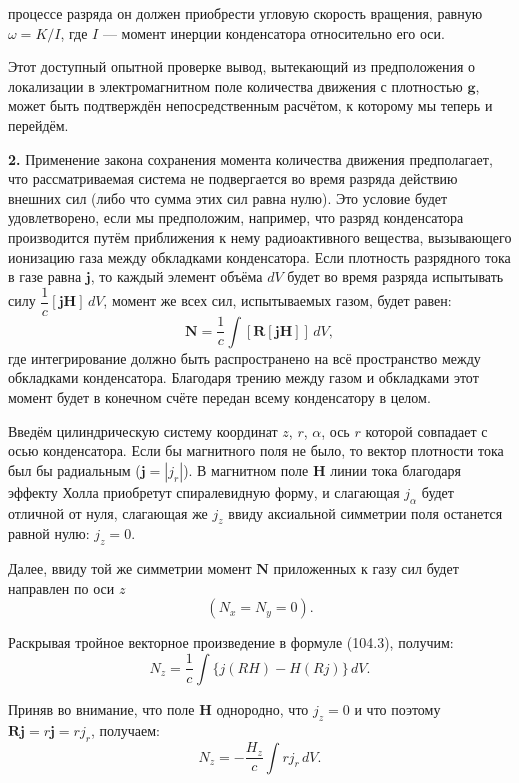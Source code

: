 \documentclass[a4paper,10pt]{article}
\begin{document}

процессе разряда он должен приобрести угловую скорость вращения, равную
$\omega = K/I$, где $I$ — момент инерции конденсатора относительно его оси.

Этот доступный опытной проверке вывод, вытекающий из предположения
о локализации в электромагнитном поле количества движения с плотностью
$\mathbf{g}$, может быть подтверждён непосредственным расчётом, к которому
мы теперь и перейдём.

\textbf{2.} Применение закона сохранения момента количества движения
предполагает, что рассматриваемая система не подвергается во время
разряда действию внешних сил (либо что сумма этих сил равна нулю). Это
условие будет удовлетворено, если мы предположим, например, что разряд
конденсатора производится путём приближения к нему радиоактивного
вещества, вызывающего ионизацию газа между обкладками конденсатора.
Если плотность разрядного тока в газе равна $\mathbf{j}$, то каждый
элемент объёма $dV$ будет во время разряда испытывать силу
$\dfrac{1}{c}[\mathbf{j}\mathbf{H}]\,dV$, момент же всех сил, испытываемых
газом, будет равен:
\begin{equation}
    \mathbf{N} = \frac{1}{c}\int[\mathbf{R}[\mathbf{j}\mathbf{H}]]\,dV,
    \tag{104.3}
\end{equation}
где интегрирование должно быть распространено на всё пространство
между обкладками конденсатора. Благодаря трению между газом и обкладками
этот момент будет в конечном счёте передан всему конденсатору в целом.

Введём цилиндрическую систему координат $z$, $r$, $\alpha$, ось $r$
которой совпадает с осью конденсатора. Если бы магнитного поля не было,
то вектор плотности тока был бы радиальным ($\mathbf{j} = |j_r|$).
В магнитном поле $\mathbf{H}$ линии тока благодаря эффекту Холла
приобретут спиралевидную форму, и слагающая $j_\alpha$ будет отличной
от нуля, слагающая же $j_z$ ввиду аксиальной симметрии поля останется
равной нулю: $j_z = 0$.

Далее, ввиду той же симметрии момент $\mathbf{N}$ приложенных к газу
сил будет направлен по оси $z$
$$
    (N_x = N_y = 0).
$$

Раскрывая тройное векторное произведение в формуле (104.3), получим:
$$
    N_z = \frac{1}{c}\int\{j(RH) - H(Rj)\}\,dV.
$$

Приняв во внимание, что поле $\mathbf{H}$ однородно, что $j_z = 0$
и что поэтому $\mathbf{R}\mathbf{j} = r\mathbf{j} = rj_r$, получаем:
$$
    N_z = -\frac{H_z}{c}\int rj_r\,dV.
$$
\end{document}
